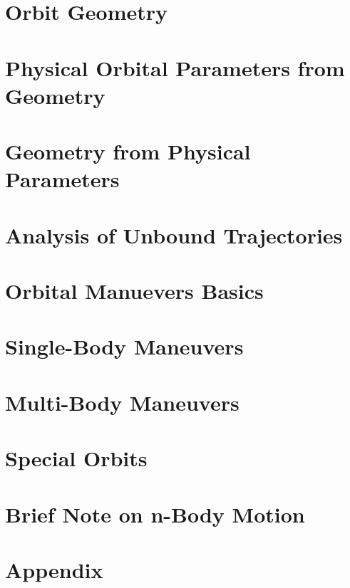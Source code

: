 \documentclass{article}
\begin{document}
\pagebreak
\section{Orbit Geometry}\label{sec:Orbit Geometry}


\pagebreak
\section{Physical Orbital Parameters from Geometry}\label{sec:Orbital Parameters from Geometry}


\pagebreak
\section{Geometry from Physical Parameters}\label{sec:Geometry from Physical Parameters}


\pagebreak
\section{Analysis of Unbound Trajectories}\label{sec:Special Trajectories}


\pagebreak
\section{Orbital Manuevers Basics}\label{sec:Manuevers Basics}


\pagebreak
\section{Single-Body Maneuvers}\label{sec:Manuevers}


\pagebreak
\section{Multi-Body Maneuvers}\label{sec:Multibody Maneuevers}


\pagebreak
\section{Special Orbits}\label{sec:Special Orbits}


\pagebreak
\section{Brief Note on n-Body Motion}\label{sec:N Body Motion}


\pagebreak
\section{Appendix}\label{sec:Appendix}



\end{document}
